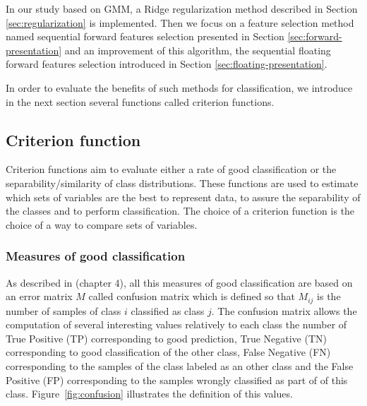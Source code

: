 \documentclass[a4paper,11pt,DIV=16]{scrartcl}
\begin{document}
    In our study based on GMM, a Ridge regularization method described in Section \ref{sec:regularization} is implemented. Then we focus on a feature selection method named sequential forward features selection presented in Section \ref{sec:forward-presentation} and an improvement of this algorithm, the sequential floating forward features selection introduced in Section \ref{sec:floating-presentation}.

    In order to evaluate the benefits of such methods for classification, we introduce in the next section several functions called criterion functions.

    \subsection{Criterion function}
    \label{sec:criterion}

    Criterion functions aim to evaluate either a rate of good classification or the separability/similarity of class distributions. These functions are used to estimate which sets of variables are the best to represent data, to assure the separability of the classes and to perform classification. The choice of a criterion function is the choice of a way to compare sets of variables.

        \subsubsection{Measures of good classification}
        \label{sec:criterion-rate}

        As described in \cite{congalton2008assessing} (chapter 4), all this measures of good classification are based on an error matrix $M$ called confusion matrix which is defined so that $M_{ij}$ is the number of samples of class $i$ classified as class $j$. The confusion matrix allows the computation of several interesting values relatively to each class the number of True Positive (TP) corresponding to good prediction, True Negative (TN) corresponding to good classification of the other class, False Negative (FN) corresponding to the samples of the class labeled as an other class and the False Positive (FP) corresponding to the samples wrongly classified as part of of this class. Figure~\ref{fig:confusion} illustrates the definition of this values.
\end{document}
